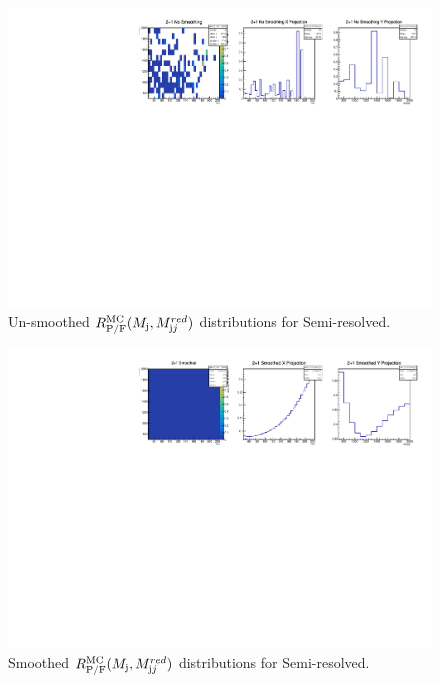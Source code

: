 \begin{figure}[!htb]
	\centering
	\includegraphics[width=1\textwidth]{Figures/21_nosmoothing.pdf}
	\caption{Un-smoothed $R^\mathrm{MC}_\mathrm{P/F}(M_{\textrm j},M_{\textrm jj}^{red})$ distributions for Semi-resolved.}
	\label{fig:qcdunsmoothing21}
\end{figure}
\begin{figure}[!htb]
	\centering
	\includegraphics[width=1\textwidth]{Figures/21_smoothed.pdf}
	\caption{Smoothed $R^\mathrm{MC}_\mathrm{P/F}(M_{\textrm j},M_{\textrm jj}^{red})$ distributions for Semi-resolved.}
	\label{fig:qcdsmoothing21}
\end{figure}

